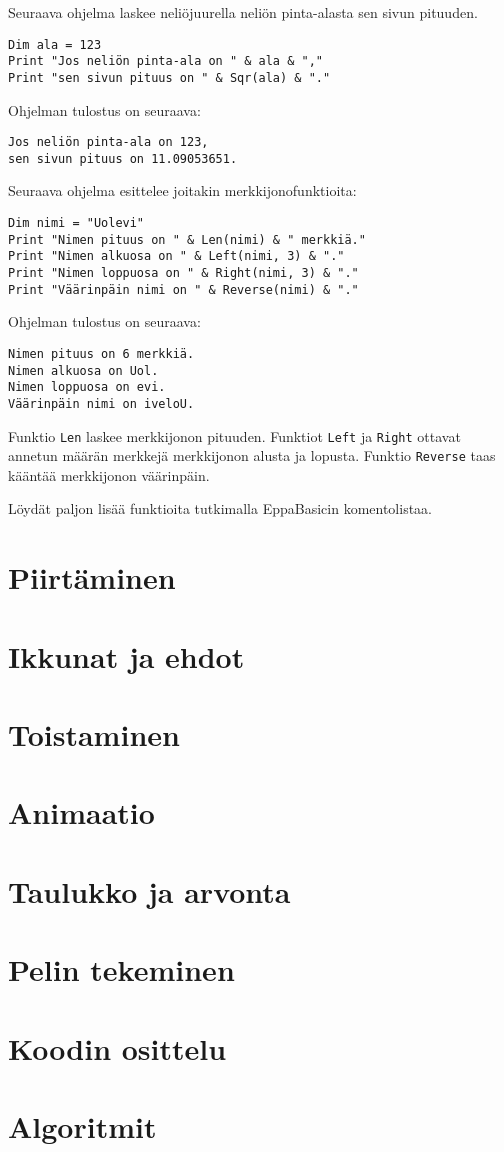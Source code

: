 \documentclass[oneside,11pt,a4paper,finnish]{book}
\begin{document}
Seuraava ohjelma laskee neliöjuurella
neliön pinta-alasta sen sivun pituuden.

\begin{verbatim}
Dim ala = 123
Print "Jos neliön pinta-ala on " & ala & ","
Print "sen sivun pituus on " & Sqr(ala) & "."
\end{verbatim}

Ohjelman tulostus on seuraava:

\begin{verbatim}
Jos neliön pinta-ala on 123,
sen sivun pituus on 11.09053651.
\end{verbatim}

Seuraava ohjelma esittelee joitakin merkkijonofunktioita:

\begin{verbatim}
Dim nimi = "Uolevi"
Print "Nimen pituus on " & Len(nimi) & " merkkiä."
Print "Nimen alkuosa on " & Left(nimi, 3) & "."
Print "Nimen loppuosa on " & Right(nimi, 3) & "."
Print "Väärinpäin nimi on " & Reverse(nimi) & "."
\end{verbatim}

Ohjelman tulostus on seuraava:

\begin{verbatim}
Nimen pituus on 6 merkkiä.
Nimen alkuosa on Uol.
Nimen loppuosa on evi.
Väärinpäin nimi on iveloU.
\end{verbatim}

Funktio \texttt{Len} laskee merkkijonon pituuden.
Funktiot \texttt{Left} ja \texttt{Right}
ottavat annetun määrän merkkejä
merkkijonon alusta ja lopusta.
Funktio \texttt{Reverse} taas kääntää merkkijonon väärinpäin.

Löydät paljon lisää funktioita tutkimalla EppaBasicin komentolistaa.

\chapter{Piirtäminen}

\chapter{Ikkunat ja ehdot}

\chapter{Toistaminen}

\chapter{Animaatio}

\chapter{Taulukko ja arvonta}

\chapter{Pelin tekeminen}


\chapter{Koodin osittelu}

\chapter{Algoritmit}
\end{document}
